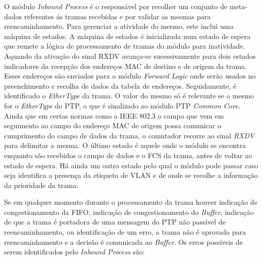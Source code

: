 O módulo \textit{Inbound Process} é o responsável por recolher um conjunto de meta-dados referentes ás tramas recebidas e por validar as mesmas para reencaminhamento. Para gerenciar a atividade do mesmo, este inclui uma máquina de estados. A máquina de estados é inicializada num estado de espera que remete a lógica de processamento de tramas do módulo para inatividade. Aquando da ativação do sinal RXDV avança-se sucessivamente para dois estados indicadores da recepção dos endereços MAC de destino e de origem da trama. Esses endereços são enviados para o módulo \textit{Forward Logic} onde serão usados no preenchimento e recolha de dados da tabela de endereços. Seguidamente, é identificado o \textit{EtherType} da trama. O valor do mesmo só é relevante se o mesmo for o \textit{EtherType} do PTP, o que é sinalizado ao módulo PTP \textit{Common Core}. Ainda que em certas normas como a IEEE 802.3 o campo que vem em seguimento ao campo do endereço MAC de origem possa comunicar o cumprimento do campo de dados da trama, o comutador recorre ao sinal \textit{RXDV} para delimitar a mesma. O último estado é aquele onde o módulo se encontra enquanto são recebidos o campo de dados e o FCS da trama, antes de voltar ao estado de espera. Há ainda um outro estado pelo qual o módulo pode passar caso seja identifica a presença da etiqueta de VLAN e de onde se recolhe a informação da prioridade da trama.   \par 
Se em qualquer momento durante o processamento da trama houver indicação de congestionamento da FIFO, indicação de congestionamento do \textit{Buffer}, indicação de que a trama é portadora de uma mensagem do PTP não passível de reencaminhamento, ou identificação de um erro, a trama não é aprovada para reencaminhamento e a decisão é comunicada ao \textit{Buffer}. Os erros possíveis de serem identificados pelo \textit{Inbound Process} são:

